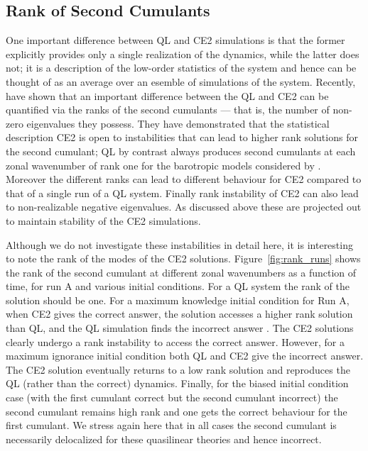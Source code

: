 \documentclass{jfm}
\newcommand{\cu}{c_u}
\begin{document}

%
\subsection{Rank of Second Cumulants}
\label{sec:rank}
One important difference between QL and CE2 simulations is that the former explicitly provides only a single realization of the dynamics, while the latter does not; it is a description of the low-order statistics of the system and hence can be thought of as an average over an esemble of simulations of the system. 
Recently, \citet{nivarti_22} have shown that an important difference between the QL and CE2 can be quantified via the ranks of the second cumulants --- that is, the number of non-zero eigenvalues they possess. They have demonstrated that the statistical description CE2 is open to instabilities that can lead to higher rank solutions for the second cumulant; QL by contrast always produces second cumulants at each zonal wavenumber of rank one for the barotropic models considered by \citet{nivarti_22}. Moreover the different ranks can lead to different behaviour for CE2 compared to that of a single run of a QL system.  Finally rank instability of CE2 can also lead to non-realizable negative eigenvalues.  As discussed above these are projected out to maintain stability of the CE2 simulations.  

Although we do not investigate these instabilities in detail here, it is interesting to note the rank of the modes of the CE2 solutions. Figure~\ref{fig:rank_runs} shows the rank of the second cumulant at different zonal wavenumbers as a function of time, for run A and various initial conditions. For a QL system the rank of the solution should be one.
For a maximum knowledge initial condition for Run A, when CE2 gives the correct answer, the solution accesses a higher rank solution than QL, and the QL simulation finds the incorrect answer 
\citep{tom_2018}. The CE2 solutions clearly undergo a rank instability to access the correct answer. However, for a maximum ignorance initial condition both QL and CE2 give the incorrect answer. The CE2 solution eventually returns to a low rank solution and reproduces the QL (rather than the correct) dynamics. Finally, for the 
biased initial condition case (with the first cumulant correct but the second cumulant incorrect) the second cumulant remains high rank and one gets the correct behaviour for the first cumulant. We stress again here that in all cases the second cumulant is necessarily delocalized for these quasilinear theories and hence incorrect.
\end{document}

